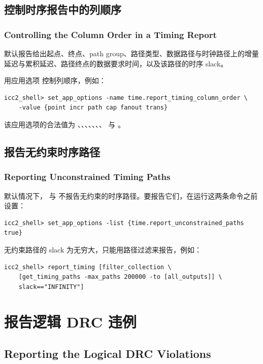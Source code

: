 \subsection{控制时序报告中的列顺序}
\subsubsection*{Controlling the Column Order in a Timing Report}

默认报告给出起点、终点、path group、路径类型、数据路径与时钟路径上的增量延迟与累积延迟、路径终点的数据要求时间，以及该路径的时序 slack。

用应用选项  控制列顺序，例如：
\begin{lstlisting}
icc2_shell> set_app_options -name time.report_timing_column_order \
    -value {point incr path cap fanout trans}
\end{lstlisting}

该应用选项的合法值为 、、、、、、、 与 。

\subsection{报告无约束时序路径}
\subsubsection*{Reporting Unconstrained Timing Paths}

默认情况下， 与  不报告无约束的时序路径。要报告它们，在运行这两条命令之前设置：
\begin{lstlisting}
icc2_shell> set_app_options -list {time.report_unconstrained_paths true}
\end{lstlisting}

无约束路径的 slack 为无穷大，只能用路径过滤来报告，例如：
\begin{lstlisting}
icc2_shell> report_timing [filter_collection \
    [get_timing_paths -max_paths 200000 -to [all_outputs]] \
    slack=="INFINITY"]
\end{lstlisting}

\section{报告逻辑 DRC 违例}
\subsection*{Reporting the Logical DRC Violations}

